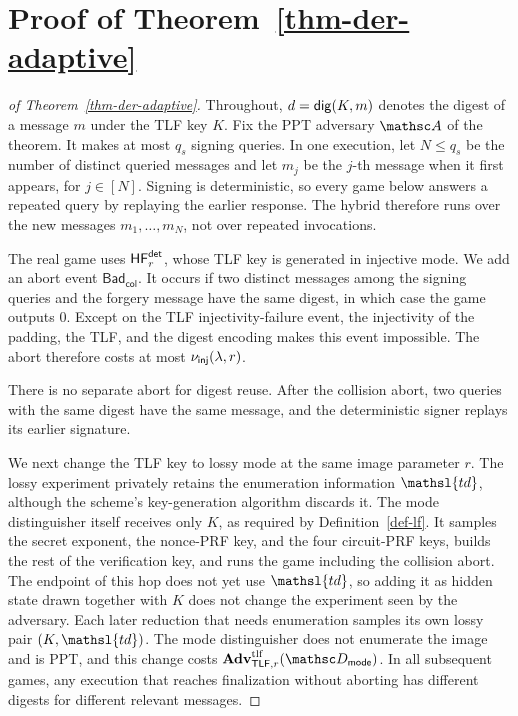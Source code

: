 \section{Proof of Theorem~\ref{thm-der-adaptive}} \label{app-derand}

\begin{proof}[of Theorem~\ref{thm-der-adaptive}]
Throughout, $d=\mathsf{dig}(K,m)$ denotes the digest of a message $m$ under the TLF key $K$. Fix the PPT adversary $\advA$ of the theorem. It makes at most $q_s$ signing queries. In one execution, let $N\le q_s$ be the number of distinct queried messages and let $m_j$ be the $j$-th message when it first appears, for $j\in[N]$. Signing is deterministic, so every game below answers a repeated query by replaying the earlier response. The hybrid therefore runs over the new messages $m_1,\ldots,m_N$, not over repeated invocations.

 The real game uses $\mathsf{HF}^{\mathsf{det}}_r$, whose TLF key is generated in injective mode. We add an abort event $\mathsf{Bad}_{\mathsf{col}}$. It occurs if two distinct messages among the signing queries and the forgery message have the same digest, in which case the game outputs 0. Except on the TLF injectivity-failure event, the injectivity of the padding, the TLF, and the digest encoding makes this event impossible. The abort therefore costs at most $\nu_{\mathsf{inj}}(\lambda,r)$.

There is no separate abort for digest reuse. After the collision abort, two queries with the same digest have the same message, and the deterministic signer replays its earlier signature.

We next change the TLF key to lossy mode at the same image parameter $r$. The lossy experiment privately retains the enumeration information $\mathsl{td}$, although the scheme's key-generation algorithm discards it. The mode distinguisher itself receives only $K$, as required by Definition~\ref{def-lf}. It samples the secret exponent, the nonce-PRF key, and the four circuit-PRF keys, builds the rest of the verification key, and runs the game including the collision abort. The endpoint of this hop does not yet use $\mathsl{td}$, so adding it as hidden state drawn together with $K$ does not change the experiment seen by the adversary. Each later reduction that needs enumeration samples its own lossy pair $(K,\mathsl{td})$. The mode distinguisher does not enumerate the image and is PPT, and this change costs $\AdvTLF{\TLF,r}{\advD_{\mathsf{mode}}}$. In all subsequent games, any execution that reaches finalization without aborting has different digests for different relevant messages.


\end{proof}

